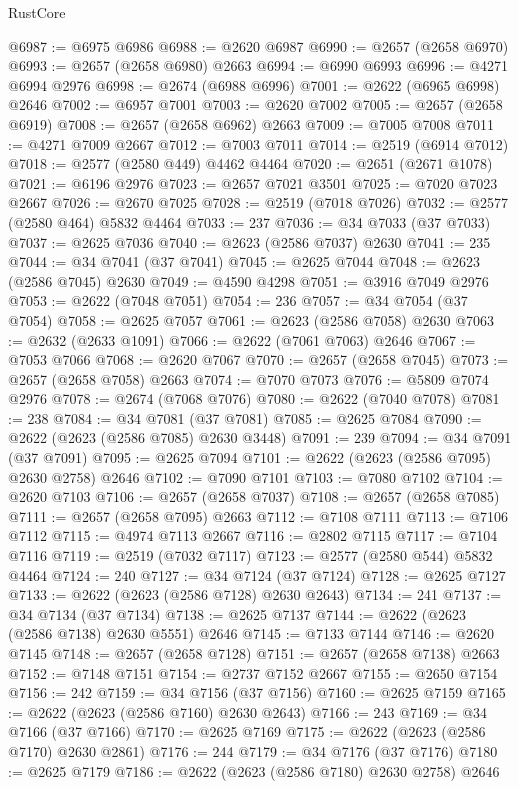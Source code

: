 \begin{lexlean}{RustCore}
\begin{coremodule}
@6987 := @6975 @6986
@6988 := @2620 @6987
@6990 := @2657 (@2658 @6970)
@6993 := @2657 (@2658 @6980) @2663
@6994 := @6990 @6993
@6996 := @4271 @6994 @2976
@6998 := @2674 (@6988 @6996)
@7001 := @2622 (@6965 @6998) @2646
@7002 := @6957 @7001
@7003 := @2620 @7002
@7005 := @2657 (@2658 @6919)
@7008 := @2657 (@2658 @6962) @2663
@7009 := @7005 @7008
@7011 := @4271 @7009 @2667
@7012 := @7003 @7011
@7014 := @2519 (@6914 @7012)
@7018 := @2577 (@2580 @449) @4462 @4464
@7020 := @2651 (@2671 @1078)
@7021 := @6196 @2976
@7023 := @2657 @7021 @3501
@7025 := @7020 @7023 @2667
@7026 := @2670 @7025
@7028 := @2519 (@7018 @7026)
@7032 := @2577 (@2580 @464) @5832 @4464
@7033 := 237
@7036 := @34 @7033 (@37 @7033)
@7037 := @2625 @7036
@7040 := @2623 (@2586 @7037) @2630
@7041 := 235
@7044 := @34 @7041 (@37 @7041)
@7045 := @2625 @7044
@7048 := @2623 (@2586 @7045) @2630
@7049 := @4590 @4298
@7051 := @3916 @7049 @2976
@7053 := @2622 (@7048 @7051)
@7054 := 236
@7057 := @34 @7054 (@37 @7054)
@7058 := @2625 @7057
@7061 := @2623 (@2586 @7058) @2630
@7063 := @2632 (@2633 @1091)
@7066 := @2622 (@7061 @7063) @2646
@7067 := @7053 @7066
@7068 := @2620 @7067
@7070 := @2657 (@2658 @7045)
@7073 := @2657 (@2658 @7058) @2663
@7074 := @7070 @7073
@7076 := @5809 @7074 @2976
@7078 := @2674 (@7068 @7076)
@7080 := @2622 (@7040 @7078)
@7081 := 238
@7084 := @34 @7081 (@37 @7081)
@7085 := @2625 @7084
@7090 := @2622 (@2623 (@2586 @7085) @2630 @3448)
@7091 := 239
@7094 := @34 @7091 (@37 @7091)
@7095 := @2625 @7094
@7101 := @2622 (@2623 (@2586 @7095) @2630 @2758) @2646
@7102 := @7090 @7101
@7103 := @7080 @7102
@7104 := @2620 @7103
@7106 := @2657 (@2658 @7037)
@7108 := @2657 (@2658 @7085)
@7111 := @2657 (@2658 @7095) @2663
@7112 := @7108 @7111
@7113 := @7106 @7112
@7115 := @4974 @7113 @2667
@7116 := @2802 @7115
@7117 := @7104 @7116
@7119 := @2519 (@7032 @7117)
@7123 := @2577 (@2580 @544) @5832 @4464
@7124 := 240
@7127 := @34 @7124 (@37 @7124)
@7128 := @2625 @7127
@7133 := @2622 (@2623 (@2586 @7128) @2630 @2643)
@7134 := 241
@7137 := @34 @7134 (@37 @7134)
@7138 := @2625 @7137
@7144 := @2622 (@2623 (@2586 @7138) @2630 @5551) @2646
@7145 := @7133 @7144
@7146 := @2620 @7145
@7148 := @2657 (@2658 @7128)
@7151 := @2657 (@2658 @7138) @2663
@7152 := @7148 @7151
@7154 := @2737 @7152 @2667
@7155 := @2650 @7154
@7156 := 242
@7159 := @34 @7156 (@37 @7156)
@7160 := @2625 @7159
@7165 := @2622 (@2623 (@2586 @7160) @2630 @2643)
@7166 := 243
@7169 := @34 @7166 (@37 @7166)
@7170 := @2625 @7169
@7175 := @2622 (@2623 (@2586 @7170) @2630 @2861)
@7176 := 244
@7179 := @34 @7176 (@37 @7176)
@7180 := @2625 @7179
@7186 := @2622 (@2623 (@2586 @7180) @2630 @2758) @2646

\end{coremodule}
\end{lexlean}
